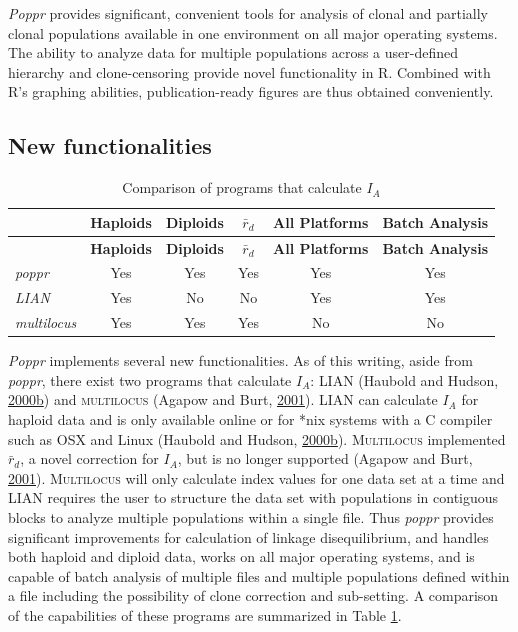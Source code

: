 \documentclass[double,12pt]{beavtex}
\begin{document}
  \emph{Poppr} provides significant, convenient tools for analysis of
  clonal and partially clonal populations available in one environment on
  all major operating systems. The ability to analyze data for multiple
  populations across a user-defined hierarchy and clone-censoring provide
  novel functionality in R. Combined with R's graphing abilities,
  publication-ready figures are thus obtained conveniently.
  
  \subsection{New functionalities}\label{new-functionalities}
  
  \begin{longtable}[]{@{}lccccc@{}}
  \caption{\label{tab:poppr5} Comparison of programs that calculate
  \(I_A\)}\tabularnewline
  \toprule
  & \textbf{Haploids} & \textbf{Diploids} & \(\bar{r}_d\) & \textbf{All
  Platforms} & \textbf{Batch Analysis}\tabularnewline
  \midrule
  \endfirsthead
  \toprule
  & \textbf{Haploids} & \textbf{Diploids} & \(\bar{r}_d\) & \textbf{All
  Platforms} & \textbf{Batch Analysis}\tabularnewline
  \midrule
  \endhead
  \emph{poppr} & Yes & Yes & Yes & Yes & Yes\tabularnewline
  \emph{LIAN} & Yes & No & No & Yes & Yes\tabularnewline
  \emph{multilocus} & Yes & Yes & Yes & No & No\tabularnewline
  \bottomrule
  \end{longtable}
  
  \emph{Poppr} implements several new functionalities. As of this writing,
  aside from \emph{poppr}, there exist two programs that calculate
  \(I_A\): \textsc{LIAN} (Haubold and Hudson,
  \protect\hyperlink{ref-Haubold:2000}{2000}\protect\hyperlink{ref-Haubold:2000}{b})
  and \textsc{multilocus} (Agapow and Burt,
  \protect\hyperlink{ref-Agapow_2001}{2001}). \textsc{LIAN} can calculate
  \(I_A\) for haploid data and is only available online or for *nix
  systems with a C compiler such as OSX and Linux (Haubold and Hudson,
  \protect\hyperlink{ref-Haubold:2000}{2000}\protect\hyperlink{ref-Haubold:2000}{b}).
  \textsc{Multilocus} implemented \(\bar{r}_d\), a novel correction for
  \(I_A\), but is no longer supported (Agapow and Burt,
  \protect\hyperlink{ref-Agapow_2001}{2001}). \textsc{Multilocus} will
  only calculate index values for one data set at a time and \textsc{LIAN}
  requires the user to structure the data set with populations in
  contiguous blocks to analyze multiple populations within a single file.
  Thus \emph{poppr} provides significant improvements for calculation of
  linkage disequilibrium, and handles both haploid and diploid data, works
  on all major operating systems, and is capable of batch analysis of
  multiple files and multiple populations defined within a file including
  the possibility of clone correction and sub-setting. A comparison of the
  capabilities of these programs are summarized in Table \ref{tab:poppr5}.
  
\end{document}
